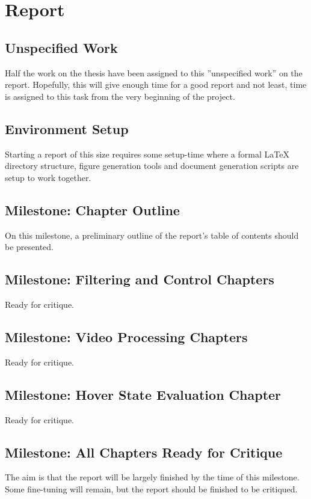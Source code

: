 \section{Report}
    \subsection{Unspecified Work}
        Half the work on the thesis have been assigned to this ''unspecified work'' on the
        report. Hopefully, this will give enough time for a good report and not
        least, time is assigned to this task from the very beginning of the project.

    \subsection{Environment Setup}
        Starting a report of this size requires some setup-time
        where a formal LaTeX directory structure, figure generation tools
        and document generation scripts are setup to work together.

    \subsection{Milestone: Chapter Outline}
        On this milestone, a preliminary outline of the report's table of
        contents should be presented.

    \subsection{Milestone: Filtering and Control Chapters}
        Ready for critique.

    \subsection{Milestone: Video Processing Chapters}
        Ready for critique.

    \subsection{Milestone: Hover State Evaluation Chapter}
        Ready for critique.

    \subsection{Milestone: All Chapters Ready for Critique}
        The aim is that the report will be largely finished by the
        time of this milestone. Some fine-tuning will remain, but the
        report should be finished to be critiqued.

